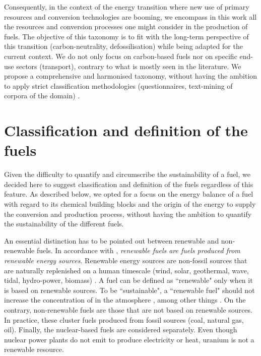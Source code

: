 Consequently, in the context of the energy transition where new use of primary resources and conversion technologies are booming, we encompass in this work all the resources and conversion processes one might consider in the production of fuels. The objective of this taxonomy is to fit with the long-term perspective of this transition (\eg carbon-neutrality, defossilisation) while being adapted for the current context.  We do not only focus on carbon-based fuels nor on specific end-use sectors (\eg transport), contrary to what is mostly seen in the literature. We propose a comprehensive and harmonised taxonomy, without having the ambition to apply strict classification methodologies (\eg questionnaires, text-mining of corpora of the domain) \cite{ncbi_fossilfuel}.  %

\section{Classification and definition of the fuels}
\label{sec:definition}
Given the difficulty to quantify and circumscribe the sustainability of a fuel, we decided here to suggest classification and definition of the fuels regardless of this feature. As described below, we opted for a focus on the energy balance of a fuel with regard to its chemical building blocks and the origin of the energy to supply the conversion and production process, without having the ambition to quantify the sustainability of the different fuels.

An essential distinction has to be pointed out between renewable and non-renewable fuels. In accordance with \cite{eu2003directive}, \textit{renewable fuels are fuels produced from renewable energy sources}. Renewable energy sources are non-fossil sources that are naturally replenished on a human timescale (wind, solar, geothermal, wave, tidal, hydro-power, biomass) \cite{ellabban2014}. A fuel can be defined as ``renewable" only when it is based on renewable sources. To be ``sustainable", a ``renewable fuel" should not increase the concentration of  in the atmosphere \cite{Dincer2020}, among other things \cite{eu_sustainable}.
On the contrary, non-renewable fuels are those that are not based on renewable sources. In practice, these cluster fuels produced from fossil sources (\eg coal, natural gas, oil). 
Finally, the nuclear-based fuels are considered separately. Even though nuclear power plants do not emit  to produce electricity or heat, uranium is not a renewable resource. 

